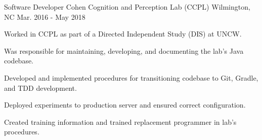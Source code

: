 \begin{cventries}
  \cventry
    {Software Developer} %
    {Cohen Cognition and Perception Lab (CCPL)} %
    {Wilmington, NC} %
    {Mar. 2016 - May 2018} %
    {
      \begin{cvitems}
        \item {Worked in CCPL as part of a Directed Independent Study (DIS) at UNCW.}
        \item {Was responsible for maintaining, developing, and documenting the lab's Java codebase.}
        \item {Developed and implemented procedures for transitioning codebase to Git, Gradle, and TDD development.}
        \item {Deployed experiments to production server and ensured correct configuration.}
        \item {Created training information and trained replacement programmer in lab's procedures.}
      \end{cvitems}
    }
    
\end{cventries}
